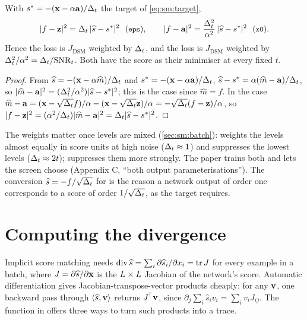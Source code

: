 \begin{proposition}
\label{prop:sm:weights}
With $s^\ast=-(\mathbf{x}-\alpha\mathbf{a})/\Delta_t$ the target of \cref{eq:sm:target},
\[
  |f-\vz|^2=\Dt\,|\widehat s-s^\ast|^2\ \ (\code{eps}),\qquad
  |f-\va|^2=\frac{\Dt^2}{\alpha^2}\,|\widehat s-s^\ast|^2\ \ (\code{x0}).
\]
Hence the  loss is $J_{\mathrm{DSM}}$ weighted by $\Delta_t$, and the  loss
is $J_{\mathrm{DSM}}$ weighted by $\Delta_t^2/\alpha^2=\Delta_t/\mathrm{SNR}_t$. Both have the
score as their minimiser at every fixed $t$.
\end{proposition}

\begin{proof}
From $\widehat s=-(\mathbf{x}-\alpha\widehat m)/\Delta_t$ and $s^\ast=-(\mathbf{x}-\alpha\mathbf{a})/\Delta_t$,
$\widehat s-s^\ast=\alpha(\widehat m-\mathbf{a})/\Delta_t$, so $|\widehat m-\mathbf{a}|^2=(\Delta_t^2/\alpha^2)|\widehat s-s^\ast|^2$;
this is the  case since $\widehat m=f$. In the  case
$\widehat m-\mathbf{a}=(\mathbf{x}-\sqrt{\Delta_t}f)/\alpha-(\mathbf{x}-\sqrt{\Delta_t}\mathbf{z})/\alpha=-\sqrt{\Delta_t}(f-\mathbf{z})/\alpha$,
so $|f-\mathbf{z}|^2=(\alpha^2/\Delta_t)|\widehat m-\mathbf{a}|^2=\Delta_t|\widehat s-s^\ast|^2$.
\end{proof}

The weights matter once levels are mixed (\cref{sec:sm:batch}):  weights the
levels almost equally in score units at high noise ($\Delta_t\approx1$) and suppresses the
lowest levels ($\Delta_t\approx2t$);  suppresses them more strongly. The paper
trains both and lets the screen choose (Appendix C, ``both output
parameterisations''). The conversion $\widehat s=-f/\sqrt{\Delta_t}$ for  is the
reason a network output of order one corresponds to a score of order $1/\sqrt{\Delta_t}$,
as the target requires.

\section{Computing the divergence}
\label{sec:sm:divergence}

Implicit score matching needs $\operatorname{div}\widehat s=\sum_i\partial\widehat s_i/\partial x_i=\operatorname{tr} J$
for every example in a batch, where $J=\partial\widehat s/\partial\mathbf{x}$ is the
$L\times L$ Jacobian of the network's score. Automatic differentiation
gives Jacobian-transpose-vector products cheaply: for any $\mathbf{v}$, one backward pass
through $\langle\widehat s,\mathbf{v}\rangle$ returns $J^{\!\top}\mathbf{v}$, since
$\partial_j\sum_i\widehat s_i v_i=\sum_i v_iJ_{ij}$. The function  in
 offers three ways to turn such products into a
trace.


